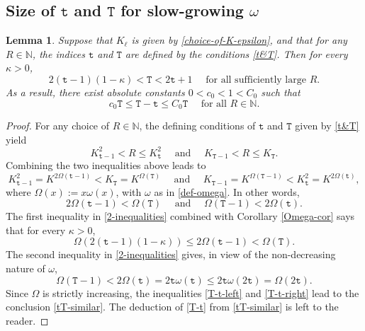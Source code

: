 \documentclass[12pt, twoside]{article}
\newtheorem{lemma}[theorem]{Lemma}
\theoremstyle{definition}
\numberwithin{equation}{section}
\begin{document}
\subsection{Size of $\mathtt t$ and $\mathtt T$ for slow-growing $\omega$} 
\begin{lemma} \label{special-tT-lemma} 
Suppose that $K_{\ell}$ is given by \eqref{choice-of-K-epsilon}, and that for any $R \in \mathbb N$, the indices $\mathtt t$ and $\mathtt T$ are defined by the conditions \eqref{t&T}. Then for every $\kappa > 0$, 
\begin{equation} \label{tT-similar}
2 (\mathtt t - 1)(1 - \kappa) < \mathtt T < 2\mathtt t+1 \quad \text{ for all sufficiently large $R$.}
\end{equation} 
As a result, there exist absolute constants $0< c_0 < 1 < C_0$ such that 
\begin{equation} \label{T-t} 
c_0\mathtt T \leq \mathtt T-\mathtt t \leq C_0 \mathtt T \quad  \text{ for all } R \in \mathbb N. 
\end{equation} 
\end{lemma} 
\begin{proof} 
For any choice of $R \in \mathbb N$, the defining conditions of $\mathtt t$ and $\mathtt T$ given by \eqref{t&T} yield
\[ K_{\mathtt t-1}^2 < R \leq K_{\mathtt t}^2 \quad \text{ and } \quad K_{\mathtt T-1} < R \leq K_{\mathtt T}. \] 
Combining the two inequalities above leads to
\[
K_{\mathtt t-1}^2 = K^{2 \Omega(\mathtt t -1)} < K_{\mathtt T} = K^{\Omega(\mathtt T)} \quad \text{ and } \quad 
K_{\mathtt T-1} = K^{\Omega(\mathtt T-1)} < K_{\mathtt t}^2 = K^{2 \Omega(\mathtt t)}, 
\]
where $\Omega(x) := x \omega(x)$, with $\omega$ as in \eqref{def-omega}. In other words, 
\begin{equation}  \label{2-inequalities}
2 \Omega(\mathtt t -1) < \Omega(\mathtt T) \quad \text{ and } \quad \Omega(\mathtt T-1) < 2 \Omega(\mathtt t). 
\end{equation}  
The first inequality in \eqref{2-inequalities} combined with Corollary \ref{Omega-cor} says that for every $\kappa > 0$, 
\begin{equation}  \label{T-t-left}
\Omega(2(\mathtt t-1)(1 - \kappa)) \leq 2 \Omega(\mathtt t-1) < \Omega(\mathtt T). 
\end{equation} 
The second inequality in  \eqref{2-inequalities} gives, in view of the non-decreasing nature of $\omega$,  
\begin{equation} \label{T-t-right}  
\Omega(\mathtt T -1) < 2 \Omega(\mathtt t) = 2 \mathtt t \omega(\mathtt t)  \leq 2 \mathtt t \omega(2 \mathtt t) = \Omega(2\mathtt t). 
\end{equation}  
Since $\Omega$ is strictly increasing, the inequalities \eqref{T-t-left} and \eqref{T-t-right} lead to the conclusion \eqref{tT-similar}. The deduction of \eqref{T-t} from \eqref{tT-similar} is left to the reader. 
\end{proof} 
\end{document}

